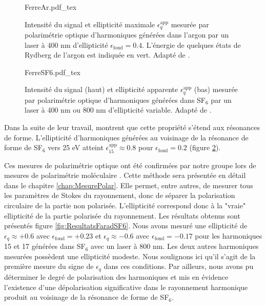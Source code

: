\begin{figure}
\centering
\def\svgwidth{\textwidth}
{FerreAr.pdf_tex}
\caption{Intensité du signal et ellipticité maximale $\epsilon_q^{\text{app}}$ mesurée par polarimétrie optique d'harmoniques générées dans l'argon par un laser à 400 nm d'ellipticité $\epsilon_{\text{fond}} = 0.4$. L'énergie de quelques états de Rydberg de l'argon est indiquée en vert. Adapté de .}
\label{fig:FerreAr}
\end{figure}

\begin{figure}
\centering
\def\svgwidth{\textwidth}
{FerreSF6.pdf_tex}
\caption{Intensité du signal (haut) et ellipticité apparente $\epsilon_q^{\text{app}}$ (bas) mesurée par polarimétrie optique d'harmoniques générées dans SF$_6$ par un laser à 400 nm ou 800 nm d'ellipticité variable. Adapté de .}
\label{fig:FerreSF6}
\end{figure}

Dans la suite de leur travail,  montrent que cette propriété s'étend aux résonances de forme. L'ellipticité d'harmoniques générées au voisinage de la résonance de forme de SF$_6$ vers 25 eV   atteint $\epsilon_{15}^{\text{app}} \approx 0.8$ pour $\epsilon_{\text{fond}} = 0.2$ (figure \ref{fig:FerreSF6}).

Ces mesures de polarimétrie optique ont été confirmées par notre groupe lors de mesures de polarimétrie moléculaire  . Cette méthode sera présentée en détail dans le chapitre \ref{chap:MesurePolar}. Elle permet, entre autres, de mesurer tous les paramètres de Stokes du rayonnement, donc de séparer la polarisation circulaire de la partie non polarisée. L'ellipticité correspond donc à la "vraie" ellipticité de la partie polarisée du rayonnement. Les résultats obtenus sont présentés figure \ref{fig:ResultatsFaradSF6}. Nous avons mesuré une ellipticité de $\epsilon_q \approx +0.6$ avec $\epsilon_{\text{fond}} = +0.23$ et $\epsilon_q \approx -0.6$ avec $\epsilon_{\text{fond}} = -0.17$ pour les harmoniques 15 et 17 générées dans SF$_6$ avec un laser à 800 nm. Les deux autres harmoniques mesurées possèdent une ellipticité modeste. Nous soulignons ici qu'il s'agit de la première mesure du signe de $\epsilon_q$ dans ces conditions. Par ailleurs, nous avons pu déterminer le degré de polarisation des harmoniques et mis en évidence l'existence d'une dépolarisation significative dans le rayonnement harmonique produit au voisinage de la résonance de forme de SF$_6$.

